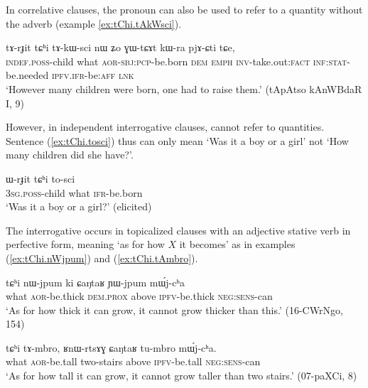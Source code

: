 In correlative clauses, the pronoun  can also be used to refer to a quantity without the adverb  (example \ref{ex:tChi.tAkWsci}).

\begin{exe}
\ex \label{ex:tChi.tAkWsci}
\gll  tɤ-rɟit tɕʰi tɤ-kɯ-sci nɯ ʑo ɣɯ-tɕɤt kɯ-ra pjɤ-ɕti tɕe,   \\
\textsc{indef}.\textsc{poss}-child what \textsc{aor}-\textsc{sbj}:\textsc{pcp}-be.born \textsc{dem} \textsc{emph} \textsc{inv}-take.out:\textsc{fact} \textsc{inf}:\textsc{stat}-be.needed \textsc{ipfv}.\textsc{ifr}-be:\textsc{aff} \textsc{lnk} \\
\glt `However many children were born, one had to raise them.' (tApAtso kAnWBdaR I, 9)
\end{exe}  

However, in independent interrogative clauses,  cannot refer to quantities. Sentence (\ref{ex:tChi.tosci}) thus can only mean `Was it a boy or a girl' not `How many children did she have?'.

\begin{exe}
\ex \label{ex:tChi.tosci}
\gll  ɯ-rɟit tɕʰi to-sci \\
\textsc{3sg}.\textsc{poss}-child what \textsc{ifr}-be.born \\
\glt `Was it a boy or a girl?' (elicited)
\end{exe}  


The interrogative  occurs in topicalized clauses with an adjective stative verb in perfective form, meaning `as for how $X$ it becomes' as in examples (\ref{ex:tChi.nWjpum}) and (\ref{ex:tChi.tAmbro}).

\begin{exe}
\ex \label{ex:tChi.nWjpum}
\gll tɕʰi nɯ-jpum ki ɕaŋtaʁ ɲɯ-jpum mɯ́j-cʰa \\
what \textsc{aor}-be.thick \textsc{dem}.\textsc{prox} above \textsc{ipfv}-be.thick \textsc{neg}:\textsc{sens}-can \\
\glt `As for how thick it can grow, it cannot grow thicker than this.' (16-CWrNgo, 154)
\end{exe}


\begin{exe}
\ex \label{ex:tChi.tAmbro}
\gll tɕʰi tɤ-mbro, ʁnɯ-rtsɤɣ ɕaŋtaʁ tu-mbro mɯ́j-cʰa.  \\
what \textsc{aor}-be.tall two-stairs above \textsc{ipfv}-be.tall \textsc{neg}:\textsc{sens}-can \\
\glt `As for how tall it can grow, it cannot grow taller than two stairs.' (07-paXCi, 8)
\end{exe}

